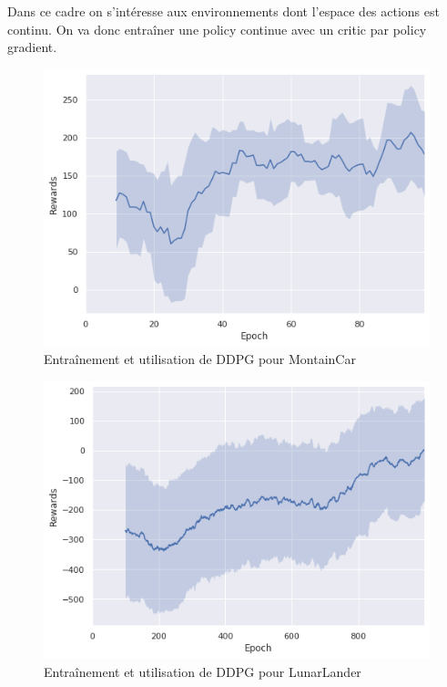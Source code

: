 \documentclass{standalone}
\begin{document}
	Dans ce cadre on s'intéresse aux environnements dont l'espace des actions est continu. On va donc entraîner une policy continue avec un critic par policy gradient.
	
			\begin{figure}[H]
		\center
		\includegraphics[scale=0.5]{img/ddpg_montaincar.png}
		
		\caption{Entraînement et utilisation de DDPG pour MontainCar}

	\end{figure}

			\begin{figure}[H]
	\center

	\includegraphics[scale=0.5]{img/ddpg_lunarlander.png}
	
	\caption{Entraînement et utilisation de DDPG pour LunarLander}

\end{figure}
	
\end{document}

